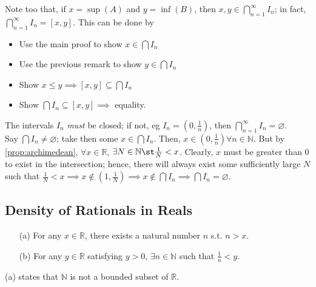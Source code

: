 \documentclass[12pt]{article}
\begin{document}
\begin{remark}[$\textcolor{red}{\star}$]
  Note too that, if $x = \sup(A)$ and $y = \inf(B)$, then $x, y \in \bigcap_{n=1}^\infty I_n$; in fact, $\bigcap_{n=1}^\infty I_n = [x,y]$. This can be done by
  \begin{itemize}
    \item Use the main proof to show $x \in \bigcap I_n$
    \item Use the previous remark to show $y \in \bigcap I_n$
    \item Show $x \leq y \implies [x,y] \subseteq \bigcap I_n$
    \item Show $\bigcap I_n \subseteq [x,y] \implies $ equality.
  \end{itemize}
\end{remark}

\begin{remark}
  The intervals $I_n$ \emph{must} be closed; if not, eg $I_n = (0, \frac{1}{n})$, then $\bigcap_{n=1}^\infty I_n = \varnothing$. \\Say $\bigcap I_n \neq \varnothing$; take then some $x \in \bigcap I_n$. Then, $x \in (0, \frac{1}{n}) \forall n \in \mathbb{N}$. But by \cref{prop:archimedean}, $\forall x \in \mathbb{R}$, $\exists N \in \mathbb{N} \st \frac{1}{N} < x$. Clearly, $x$ must be greater than $0$ to exist in the intersection; hence, there will always exist some sufficiently large $N$ such that $\frac{1}{N} < x \implies x \notin (1, \frac{1}{N}) \implies x \notin \bigcap I_n \implies \bigcap I_n = \varnothing$.
\end{remark}

\subsection{Density of Rationals in Reals}

\begin{proposition}\label{prop:archimedean}
  \begin{itemize}
    \item[(a)] For any $x \in \mathbb{R}$, there exists a natural number $n$ s.t. $n > x$.
    \item[(b)] For any $y \in \mathbb{R}$ satisfying $y > 0$, $\exists n \in \mathbb{N}$ such that $\frac{1}{n} < y$.
  \end{itemize}
\end{proposition}
\begin{remark}
  (a) states that $\mathbb{N}$ is not a bounded subset of $\mathbb{R}$.

\end{remark}
  
\end{document}
